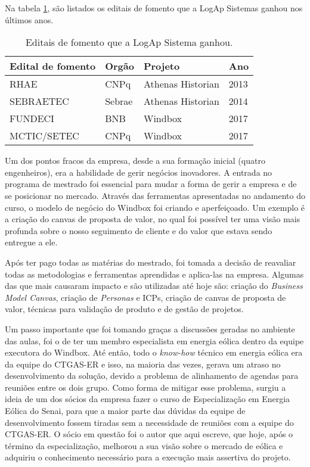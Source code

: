Na tabela \ref{Tab:editaisFomento}, são listados os editais de fomento que a LogAp Sistemas ganhou nos últimos anos.

\begin{table}[htbp]
\begin{tabularx}{\linewidth}{|X|X|X|X|} \hline
\textbf{Edital de fomento} & \textbf{Orgão} & \textbf{Projeto} & \textbf{Ano} \\ \hline
RHAE & CNPq & Athenas Historian & 2013\\ \hline
SEBRAETEC & Sebrae & Athenas Historian & 2014 \\ \hline
FUNDECI & BNB & Windbox & 2017 \\ \hline
MCTIC/SETEC & CNPq & Windbox & 2017 \\ \hline
\end{tabularx}
\caption{Editais de fomento que a LogAp Sistema ganhou.}
\label{Tab:editaisFomento}
\end{table}


Um dos pontos fracos da empresa, desde a sua formação inicial (quatro engenheiros), era a habilidade de gerir negócios inovadores. A entrada no programa de mestrado foi essencial para mudar a forma de gerir a empresa e de se posicionar no mercado. Através das ferramentas apresentadas no andamento do curso, o modelo de negócio do Windbox foi criando e aperfeiçoado. Um exemplo é a criação do canvas de proposta de valor, no qual foi possível ter uma visão mais profunda sobre o nosso seguimento de cliente e do valor que estava sendo entregue a ele. 

Após ter pago todas as matérias do mestrado, foi tomada a decisão de reavaliar todas as metodologias e ferramentas aprendidas e aplica-las na empresa. Algumas das que mais causaram impacto e são utilizadas até hoje são: criação do \textit{Business Model Canvas}, criação de \textit{Personas} e ICPs, criação de canvas de proposta de valor, técnicas para validação de produto e de gestão de projetos. 

Um passo importante que foi tomando graças a discussões geradas no ambiente das aulas, foi o de ter um membro especialista em energia eólica dentro da equipe executora do Windbox. Até então, todo o \textit{know-how} técnico em energia eólica era da equipe do CTGAS-ER e isso, na maioria das vezes, gerava um atraso no desenvolvimento da solução, devido a problema de alinhamento de agendas para reuniões entre os dois grupo. Como forma de mitigar esse problema, surgiu a ideia de um dos sócios da empresa fazer o curso de Especialização em Energia Eólica do Senai, para que a maior parte das dúvidas da equipe de desenvolvimento fossem tiradas sem a necessidade de reuniões com a equipe do CTGAS-ER. O sócio em questão foi o autor que aqui escreve, que hoje, após o término da especialização, melhorou a sua visão sobre o mercado de eólica e adquiriu o conhecimento necessário para a execução mais assertiva do projeto.

